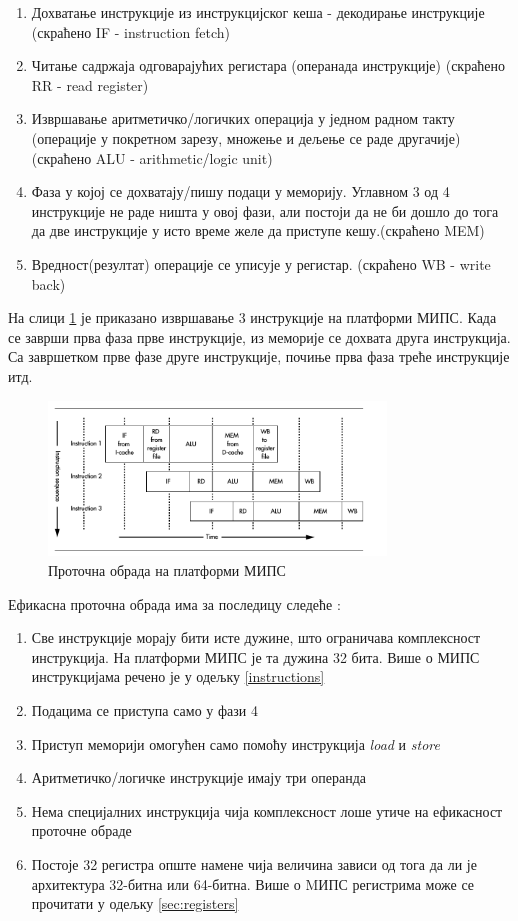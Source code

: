 \documentclass[12pt,oneside]{memoir}
\begin{document}
\begin{enumerate}
\item Дохватање инструкције из инструкцијског кеша - декодирање инструкције (скраћено IF - instruction fetch)
\item Читање садржаја одговарајућих регистара (операнада инструкције) (скраћено RR - read register)
\item Извршавање аритметичко/логичких операција у једном радном такту (операције у покретном зарезу, множење и дељење се раде другачије) (скраћено ALU - arithmetic/logic unit)
\item  Фаза у којој се дохватају/пишу подаци у меморију. Углавном 3 од 4 инструкције не раде ништа у овој фази, али постоји да не би дошло до тога да две инструкције у исто време желе да приступе кешу.(скраћено MEM)
\item Вредност(резултат) операције се уписује у регистар. (скраћено WB - write back)
\end{enumerate}

На слици \ref{fig:pipeline} је приказано извршавање 3 инструкције на платформи МИПС. Када се заврши прва фаза прве инструкције, из меморије се дохвата друга инструкција. Са завршетком прве фазе друге инструкције, почиње прва фаза треће инструкције итд. 

\begin{figure}[!ht]
  \centering
  \includegraphics[width=0.8\textwidth]{pipeline.png}
  \caption{Проточна обрада на платформи МИПС}
  \label{fig:pipeline}
\end{figure}

Ефикасна проточна обрада има за последицу следеће \cite{mips}:
\begin{enumerate}
\item Све инструкције морају бити исте дужине, што ограничава комплексност инструкција. На платформи МИПС је та дужина 32 бита. Више о МИПС инструкцијама речено је у одељку \ref{instructions}
\item Подацима се приступа само у фази 4
\item Приступ меморији омогућен само помоћу инструкција \textit{load} и \textit{store}
\item Аритметичко/логичке инструкције имају три операнда
\item Нема специјалних инструкција чија комплексност лоше утиче на ефикасност проточне обраде
\item Постоје 32 регистра опште намене чија  величина зависи од тога да ли је архитектура 32-битна или 64-битна. Више о MИПС регистрима може се прочитати у одељку \ref{sec:registers}
\end{enumerate}
\end{document}
